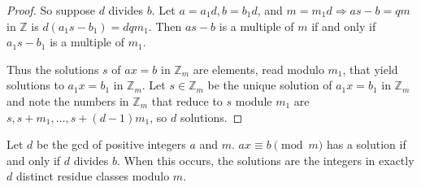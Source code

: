 \documentclass[a4paper,11pt]{article}
\begin{document}
\begin{outline}
\begin{proof}
      So suppose \(d\) divides \(b\). Let \(a = a_1d, b = b_1d\), and \(m = m_1d \Rightarrow as -b = qm\) in 
      \(\mathbb{Z}\) is \(d(a_1s-b_1) = dqm_1\). Then \(as - b\) is a multiple of \(m\) if and only if 
      \(a_1s - b_1\) is a multiple of \(m_1\).
      
      Thus the solutions \(s\) of \(ax = b\) in \(\mathbb{Z}_m\) are elements, read modulo \(m_1\), that yield solutions
      to \(a_1x = b_1\) in \(\mathbb{Z}_m\). Let \(s \in \mathbb{Z}_m\) be the unique solution of \(a_1x = b_1\) in
      \(\mathbb{Z}_m\) and note the numbers in \(\mathbb{Z}_m\) that reduce to \(s\) module \(m_1\) are \(s, s + m_1,
      \ldots, s + (d-1)m_1\), so \(d\) solutions.
    \end{proof}

    Let \(d\) be the gcd of positive integers \(a\) and \(m\). \(ax \equiv b \pmod{m}\) has a solution
    if and only if \(d\) divides \(b\). When this occurs, the solutions are the integers in exactly \(d\) distinct residue
    classes modulo \(m\).

\end{outline}
\end{document}
